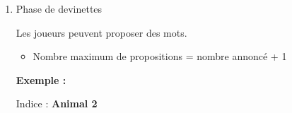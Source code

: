 \documentclass[12pt,a4paper]{article}
\begin{document}
\begin{enumerate}
\begin{enumerate}
                            \begin{tcolorbox}
                            Indice : \textbf{Animal 2}
                            \end{tcolorbox}

                            Cela signifie que 2 mots sur la table sont liés à "animal".

                            \vspace{0.5cm}
                            
                            \textbf{Règles strictes pour les indices}

                            \begin{itemize}
                                \item Un seul mot (pas de phrase)
                                \item Pas un mot présent sur la table
                                \item Pas une partie d’un mot (ex : "auto" pour "automobile" interdit)
                                \item Pas de traduction directe (ex : dire "dog" pour "chien")
                                \item Pas de communication non verbale
                            \end{itemize}

                        \vspace{0.5cm}
                        
                        \item Phase de devinettes

                            Les joueurs peuvent proposer des mots.

                            \begin{itemize}
                                \item Nombre maximum de propositions = nombre annoncé + 1
                            \end{itemize}

                            \vspace{0.5cm}

                            \textbf{Exemple :}

                            \begin{tcolorbox}
                            Indice : \textbf{Animal 2}
                            \end{tcolorbox}


\end{enumerate}
\end{enumerate}
\end{document}
